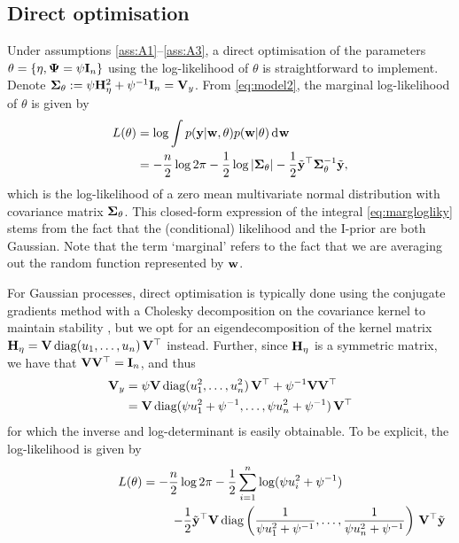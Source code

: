 \subsection{Direct optimisation}

Under assumptions \ref{ass:A1}--\ref{ass:A3}, a direct optimisation of the parameters $\theta=\{\eta,\bPsi=\psi\bI_n \}$ using the log-likelihood of $\theta$ is straightforward to implement.
Denote $\bSigma_\theta := \psi\bH_\eta^2 + \psi^{-1}\bI_n = \bV_y$.
From \cref{eq:model2}, the marginal log-likelihood of $\theta$ is given by
%
\begin{align}
  L(\theta)
  &= \log \int p(\by|\bw,\theta)p(\bw|\theta) \dint \bw \nonumber \\
  &= -\half[n]\log 2\pi - \half\log\vert \bSigma_\theta \vert - \half \tilde\by^\top \bSigma_\theta^{-1} \tilde\by \label{eq:marglogliky},
\end{align}
%
which is the log-likelihood of a zero mean multivariate normal distribution with covariance matrix $\bSigma_\theta$.
This closed-form expression of the integral \cref{eq:marglogliky} stems from the fact that the (conditional) likelihood and the I-prior are both Gaussian.
Note that the term `marginal' refers to the fact that we are averaging out the random function represented by $\bw$.

For Gaussian processes, direct optimisation is typically done using the conjugate gradients method with a Cholesky decomposition on the covariance kernel to maintain stability \citep{rasmussen2006gaussian}, but we opt for an eigendecomposition of the kernel matrix $\bH_{\eta} = \bV \, \text{diag}(u_1,\dots,u_n) \, \bV^\top$ instead.
Further, since $\bH_{\eta}$ is a symmetric matrix, we have that $\bV\bV^\top = \bI_n$, and thus
\begin{align*}
  \bV_y 
  &= \psi\bV \, \text{diag}(u_1^2,\dots,u_n^2) \, \bV^\top + \psi^{-1} \bV\bV^\top \\
  &= \bV \, \text{diag} (\psi u_1^2 + \psi^{-1},\dots,\psi u_n^2 + \psi^{-1}) \, \bV^\top 
\end{align*}
for which the inverse and log-determinant is easily obtainable.
To be explicit, the log-likelihood is given by
\begin{equation}
  \begin{gathered}
    L(\theta) 
    = -\half[n]\log 2\pi 
    - \half\sum_{i=1}^n\log(\psi u_i^2 + \psi^{-1}) \\
    \hspace{4.5cm} - \half \tilde\by^\top \bV \, 
    \text{diag} \left(\frac{1}{\psi u_1^2 + \psi^{-1}},\dots,\frac{1}{\psi u_n^2 + \psi^{-1}}\right) 
    \, \bV^\top \tilde\by
  \end{gathered}
\end{equation}

